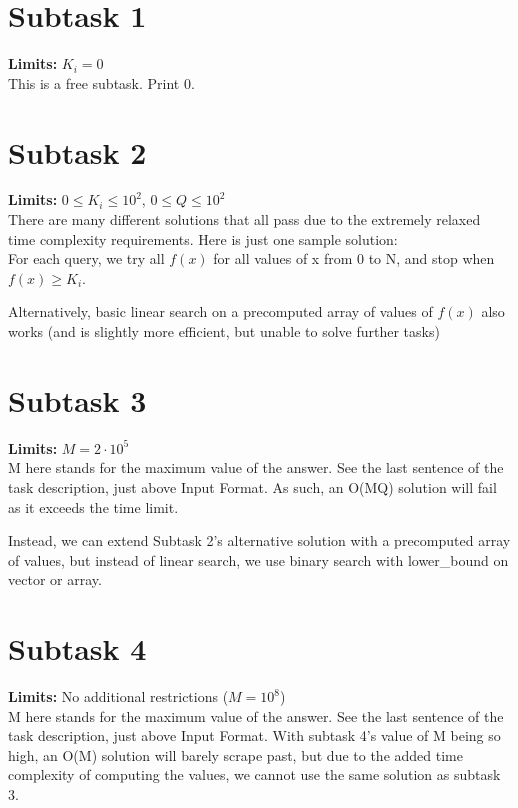 \documentclass{report}
\begin{document}
\section*{Subtask 1}
\textbf{Limits: } $K_i = 0$\\
This is a free subtask. Print 0.

\section*{Subtask 2}
\textbf{Limits: } $0 \leq K_i \leq 10^2$, $0 \leq Q \leq 10^2$\\
There are many different solutions that all pass due to the extremely relaxed time complexity requirements. Here is just one sample solution:\\

For each query, we try all $f(x)$ for all values of x from 0 to N, and stop when $f(x) \geq K_i$.

Alternatively, basic linear search on a precomputed array of values of $f(x)$ also works (and is slightly more efficient, but unable to solve further tasks)

\section*{Subtask 3}
\textbf{Limits: } $M = 2 \cdot 10^5$\\

M here stands for the maximum value of the answer. See the last sentence of the task description, just above Input Format. As such, an O(MQ) solution will fail as it exceeds the time limit. 

Instead, we can extend Subtask 2's alternative solution with a precomputed array of values, but instead of linear search, we use binary search with lower\_bound on vector or array.

\section*{Subtask 4}
\textbf{Limits: } No additional restrictions ($M = 10^8$)\\

M here stands for the maximum value of the answer. See the last sentence of the task description, just above Input Format. With subtask 4's value of M being so high, an O(M) solution will barely scrape past, but due to the added time complexity of computing the values, we cannot use the same solution as subtask 3.
\end{document}
